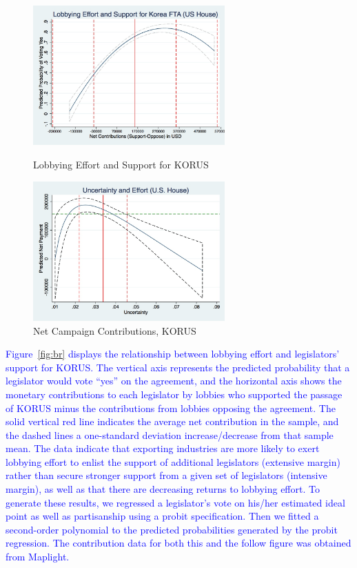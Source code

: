 \documentclass[12pt]{article}
\begin{document}
\begin{figure}
\centering
\begin{minipage}{.5\textwidth}
  \centering
  \includegraphics[width=2.9in]{graph2.jpg}
  \caption{Lobbying Effort and Support for KORUS
	\label{fig:br}}
\end{minipage}%
\begin{minipage}{.5\textwidth}
  \centering
  \includegraphics[width=2.9in]{graph1.jpg}
  \caption{Net Campaign Contributions, KORUS
	\label{fig:g1}}
\end{minipage}
\end{figure}

\textcolor{blue}{Figure~\ref{fig:br} displays the relationship between lobbying effort and legislators' support for KORUS. The vertical axis represents the predicted probability that a legislator would vote ``yes'' on the agreement, and the horizontal axis shows the monetary contributions to each legislator by lobbies who supported the passage of KORUS minus the contributions from lobbies opposing the agreement. The solid vertical red line indicates the average net contribution in the sample, and the dashed lines a one-standard deviation increase/decrease from that sample mean. The data indicate that exporting industries are more likely to exert lobbying effort to enlist the support of additional legislators (extensive margin) rather than secure stronger support from a given set of legislators (intensive margin), as well as that there are decreasing returns to lobbying effort. To generate these results,  we regressed a legislator's vote on his/her estimated ideal point as well as partisanship using a probit specification. Then we fitted a second-order polynomial to the predicted probabilities generated by the probit regression. The contribution data for both this and the follow figure was obtained from Maplight.}
\end{document}

